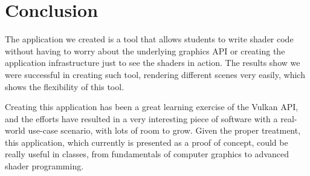\chapter{Conclusion}
The application we created is a tool that allows students to write shader code without having to worry about the underlying graphics API or creating the application infrastructure just to see the shaders in action. The results show we were successful in creating such tool, rendering different scenes very easily, which shows the flexibility of this tool.

Creating this application has been a great learning exercise of the Vulkan API, and the efforts have resulted in a very interesting piece of software with a real-world use-case scenario, with lots of room to grow. Given the proper treatment, this application, which currently is presented as a proof of concept, could be really useful in classes, from fundamentals of computer graphics to advanced shader programming.
